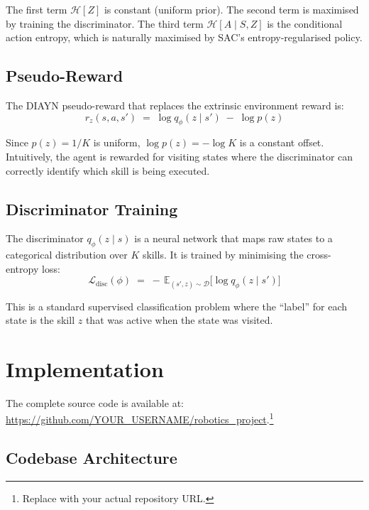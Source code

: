 \documentclass[11pt,a4paper]{article}
\begin{document}
The first term $\mathcal{H}[Z]$ is constant (uniform prior). The second term is maximised by training the discriminator. The third term $\mathcal{H}[A\mid S,Z]$ is the conditional action entropy, which is naturally maximised by SAC's entropy-regularised policy.

\subsection{Pseudo-Reward}

The DIAYN pseudo-reward that replaces the extrinsic environment reward is:
\begin{equation}\label{eq:reward}
    r_z(s,a,s') \;=\; \log q_\phi(z \mid s') \;-\; \log p(z)
\end{equation}

Since $p(z) = 1/K$ is uniform, $\log p(z) = -\log K$ is a constant offset. Intuitively, the agent is rewarded for visiting states where the discriminator can correctly identify which skill is being executed.

\subsection{Discriminator Training}

The discriminator $q_\phi(z\mid s)$ is a neural network that maps raw states to a categorical distribution over $K$ skills. It is trained by minimising the cross-entropy loss:
\begin{equation}\label{eq:disc-loss}
    \mathcal{L}_{\text{disc}}(\phi) \;=\; -\,\mathbb{E}_{(s',z)\sim\mathcal{D}}\!\big[\log q_\phi(z\mid s')\big]
\end{equation}

This is a standard supervised classification problem where the ``label'' for each state is the skill $z$ that was active when the state was visited.

\section{Implementation}

The complete source code is available at: \url{https://github.com/YOUR_USERNAME/robotics_project}.\footnote{Replace with your actual repository URL.}

\subsection{Codebase Architecture}
\end{document}
